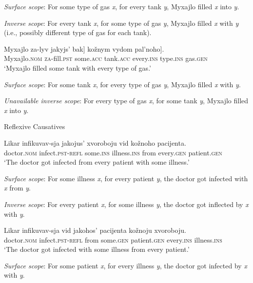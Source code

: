 \documentclass[output=paper,colorlinks,citecolor=brown]{langscibook}
\begin{document}
\textit{Surface scope}: For some type of gas \textit{x}, for every tank \textit{y}, Myxajlo filled \textit{x} into \textit{y}.

\textit{Inverse scope}: For every tank \textit{x}, for some type of gas \textit{y}, Myxajlo filled \textit{x} with \textit{y} (i.e., possibly different type of gas for each tank).

\ex \label{ex:antonyuk:8b}
\gll    Myxajlo   za-lyv     \minsp{[} jakyjs’ bak]     \minsp{[} kožnym vydom pal’noho].\\
  Myxajlo.\textsc{nom}   \textsc{za}-fill.\textsc{pst} {} some.\textsc{acc} tank.\textsc{acc}   {} every.\textsc{ins} type.\textsc{ins} gas.\textsc{gen}\\
\glt `Myxajlo filled some tank with every type of gas.’

\textit{Surface scope}: For some tank \textit{x}, for every type of gas \textit{y}, Myxajlo filled \textit{x} with \textit{y}.

\textit{Unavailable inverse scope}:  For every type of gas \textit{x}, for some tank \textit{y}, Myxajlo filled \textit{x} into \textit{y}.

    \z
\z

\newpage
\ea%
    \label{ex:antonyuk:9}
Reflexive Causatives

 \ea
\gll   Likar   infikuvav-sja   jakojus’ xvoroboju   vid kožnoho pacijenta.\\
  doctor.\textsc{nom}   infect.\textsc{pst-refl}  some.\textsc{ins} illness.\textsc{ins}   from every.\textsc{gen} patient.\textsc{gen}\\
\glt `The doctor got infected from every patient with some illness.’

\textit{Surface scope}: For some illness \textit{x}, for every patient \textit{y}, the doctor got infected with \textit{x} from \textit{y}.

\textit{Inverse scope}: For every patient \textit{x}, for some illness \textit{y}, the doctor got inflected by \textit{x} with \textit{y}.

\ex
\gll Likar   infikuvav-sja   vid jakohos’  pacijenta   kožnoju xvoroboju.\\
  doctor.\textsc{nom}   infect.\textsc{pst-refl} from some.\textsc{gen} patient.\textsc{gen}    every.\textsc{ins} illness.\textsc{ins}\\
\glt `The doctor got infected with some illness from every patient.’

\textit{Surface scope}: For some patient \textit{x}, for every illness \textit{y}, the doctor got infected by \textit{x} with \textit{y}.
\end{document}
